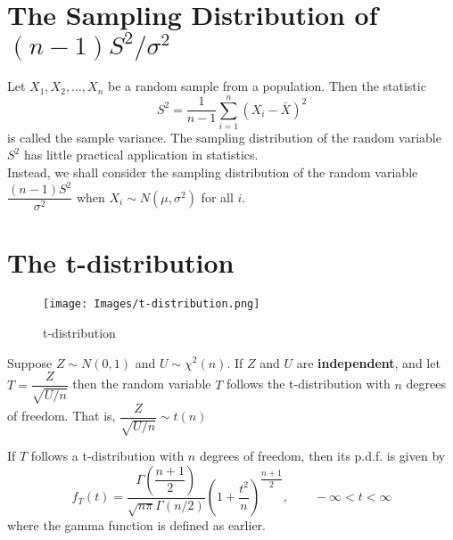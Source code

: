 \section{The Sampling Distribution of $(n-1)S^2/\sigma^2$}
Let $X_1, X_2, \dots, X_n$ be a random sample from a population. Then the statistic
$$
S^2 = \dfrac{1}{n - 1} \sum_{i = 1}^n (X_i - \bar{X})^2
$$ is called the sample variance.
The sampling distribution of the random variable $S^2$ has little practical application in statistics. \\
Instead, we shall consider the sampling distribution of the random variable $\dfrac{(n-1)S^2}{\sigma^2}$ when $X_i \sim N(\mu, \sigma^2)$ for all $i$.


\section{The t-distribution}
\begin{figure}
    \centering
    \texttt{[image: Images/t-distribution.png]}
    \caption{t-distribution}
    \label{fig:my_label}
\end{figure}
\begin{definition}[t-distribution]
Suppose $Z \sim N(0,1)$ and $U \sim \chi^2(n)$. If $Z$ and $U$ are \textbf{independent}, and let $T = \dfrac{Z}{\sqrt{U/n}}$ then the random variable $T$ follows the t-distribution with $n$ degrees of freedom. That is, $\dfrac{Z}{\sqrt{U/n}} \sim t(n)$
\end{definition}
If $T$ follows a t-distribution with $n$ degrees of freedom, then its p.d.f. is given by 
$$
f_T(t) = \dfrac{\Gamma \left( \dfrac{n + 1}{2}\right)}{\sqrt{n\pi}\Gamma(n/2)} \left( 1 + \dfrac{t^2}{n}\right)^{\dfrac{n+1}{2}}, \qquad -\infty < t < \infty
$$
where the gamma function is defined as earlier.

